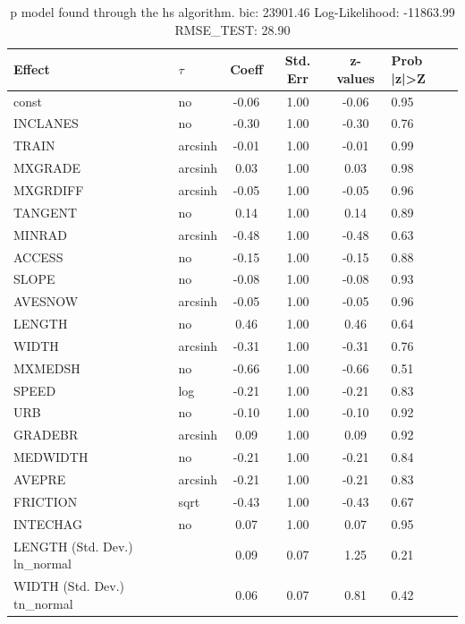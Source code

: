 \begin{table}
	\caption{p model found through the hs algorithm. bic: 23901.46 Log-Likelihood: -11863.99 RMSE_TEST: 28.90}
	\begin{center}
		\begin{tabular}{|l|l|c|c|c|l|}
			\hline
			Effect & $\tau$ & Coeff & Std. Err & z-values & Prob |z|>Z \\
			\hline
			const & no & -0.06 & 1.00 & -0.06 & 0.95 \\
			\hline
			INCLANES & no & -0.30 & 1.00 & -0.30 & 0.76 \\
			\hline
			TRAIN & arcsinh & -0.01 & 1.00 & -0.01 & 0.99 \\
			\hline
			MXGRADE & arcsinh & 0.03 & 1.00 & 0.03 & 0.98 \\
			\hline
			MXGRDIFF & arcsinh & -0.05 & 1.00 & -0.05 & 0.96 \\
			\hline
			TANGENT & no & 0.14 & 1.00 & 0.14 & 0.89 \\
			\hline
			MINRAD & arcsinh & -0.48 & 1.00 & -0.48 & 0.63 \\
			\hline
			ACCESS & no & -0.15 & 1.00 & -0.15 & 0.88 \\
			\hline
			SLOPE & no & -0.08 & 1.00 & -0.08 & 0.93 \\
			\hline
			AVESNOW & arcsinh & -0.05 & 1.00 & -0.05 & 0.96 \\
			\hline
			LENGTH & no & 0.46 & 1.00 & 0.46 & 0.64 \\
			\hline
			WIDTH & arcsinh & -0.31 & 1.00 & -0.31 & 0.76 \\
			\hline
			MXMEDSH & no & -0.66 & 1.00 & -0.66 & 0.51 \\
			\hline
			SPEED & log & -0.21 & 1.00 & -0.21 & 0.83 \\
			\hline
			URB & no & -0.10 & 1.00 & -0.10 & 0.92 \\
			\hline
			GRADEBR & arcsinh & 0.09 & 1.00 & 0.09 & 0.92 \\
			\hline
			MEDWIDTH & no & -0.21 & 1.00 & -0.21 & 0.84 \\
			\hline
			AVEPRE & arcsinh & -0.21 & 1.00 & -0.21 & 0.83 \\
			\hline
			FRICTION & sqrt & -0.43 & 1.00 & -0.43 & 0.67 \\
			\hline
			INTECHAG & no & 0.07 & 1.00 & 0.07 & 0.95 \\
			\hline
			LENGTH (Std. Dev.) ln_normal &  & 0.09 & 0.07 & 1.25 & 0.21 \\
			\hline
			WIDTH (Std. Dev.) tn_normal &  & 0.06 & 0.07 & 0.81 & 0.42 \\

\end{tabular}
\end{center}
\end{table}
